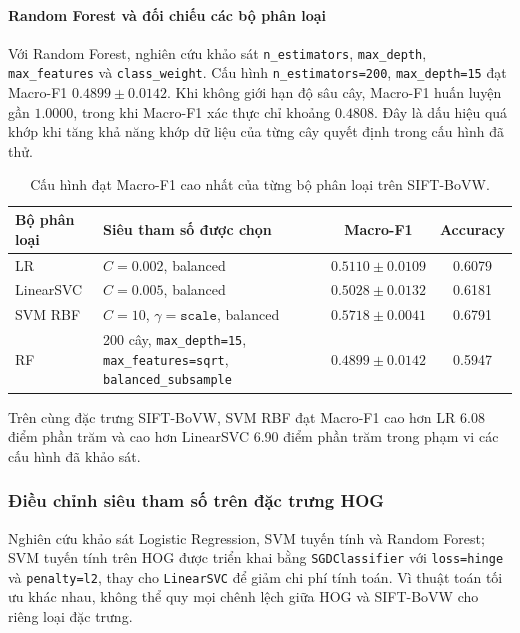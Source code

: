 \paragraph{Random Forest và đối chiếu các bộ phân loại}\mbox{}\par
Với Random Forest, nghiên cứu khảo sát \texttt{n\_estimators}, \texttt{max\_depth}, \texttt{max\_features} và \texttt{class\_weight}. Cấu hình \texttt{n\_estimators=200}, \texttt{max\_depth=15} đạt Macro-F1 $0.4899\pm0.0142$. Khi không giới hạn độ sâu cây, Macro-F1 huấn luyện gần $1.0000$, trong khi Macro-F1 xác thực chỉ khoảng $0.4808$. Đây là dấu hiệu quá khớp khi tăng khả năng khớp dữ liệu của từng cây quyết định trong cấu hình đã thử.

\begin{table}[H]\centering\caption{Cấu hình đạt Macro-F1 cao nhất của từng bộ phân loại trên SIFT-BoVW.}\label{tab:siftbest}
\small\begin{tabularx}{\linewidth}{@{}lXcc@{}}\toprule
Bộ phân loại & Siêu tham số được chọn & Macro-F1 & Accuracy\\\midrule
LR & $C=0.002$, balanced & $0.5110\pm0.0109$ & 0.6079\\
LinearSVC & $C=0.005$, balanced & $0.5028\pm0.0132$ & 0.6181\\
SVM RBF & $C=10$, $\gamma=\texttt{scale}$, balanced & \textbf{$0.5718\pm0.0041$} & 0.6791\\
RF & 200 cây, \texttt{max\_depth=15}, \texttt{max\_features=sqrt}, \texttt{balanced\_subsample} & $0.4899\pm0.0142$ & 0.5947\\\bottomrule
\end{tabularx}\end{table}

Trên cùng đặc trưng SIFT-BoVW, SVM RBF đạt Macro-F1 cao hơn LR 6.08 điểm phần trăm và cao hơn LinearSVC 6.90 điểm phần trăm trong phạm vi các cấu hình đã khảo sát.

\subsubsection{Điều chỉnh siêu tham số trên đặc trưng HOG}
\label{subsec:hog}
Nghiên cứu khảo sát Logistic Regression, SVM tuyến tính và Random Forest; SVM tuyến tính trên HOG được triển khai bằng \texttt{SGDClassifier} với \texttt{loss=hinge} và \texttt{penalty=l2}, thay cho \texttt{LinearSVC} để giảm chi phí tính toán. Vì thuật toán tối ưu khác nhau, không thể quy mọi chênh lệch giữa HOG và SIFT-BoVW cho riêng loại đặc trưng.

